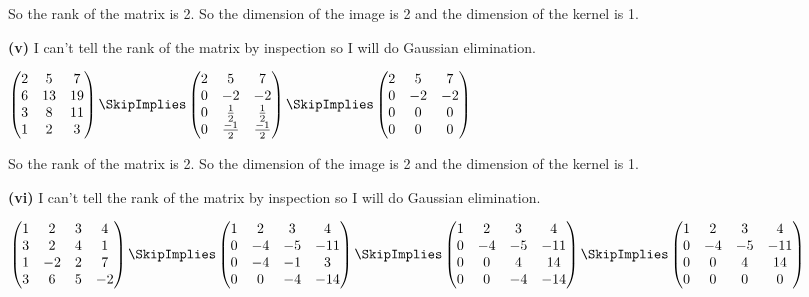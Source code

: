 \documentclass[oneside,12pt]{amsart}
\begin{document}
\bigskip

So the rank of the matrix is 2. So the dimension of the image is 2 and the
dimension of the kernel is 1.

\bigskip

\textbf{(v)} I can't tell the rank of the matrix by inspection so I will do
Gaussian elimination.

\bigskip

$
\begin{pmatrix}
2 & 5 & 7 \\
6 & 13 & 19 \\
3 & 8 & 11 \\
1 & 2 & 3
\end{pmatrix}
\SkipImplies
\begin{pmatrix}
2 & 5 & 7 \\
0 & -2 & -2 \\
0 & \frac{1}{2} & \frac{1}{2} \\
0 & \frac{-1}{2} & \frac{-1}{2}
\end{pmatrix}
\SkipImplies
\begin{pmatrix}
2 & 5 & 7 \\
0 & -2 & -2 \\
0 & 0 & 0 \\
0 & 0 & 0
\end{pmatrix}
$

\bigskip

So the rank of the matrix is 2. So the dimension of the image is 2 and the
dimension of the kernel is 1.

\bigskip

\textbf{(vi)} I can't tell the rank of the matrix by inspection so I will do
Gaussian elimination.

\bigskip

$
\begin{pmatrix}
1 & 2 & 3 & 4 \\
3 & 2 & 4 & 1 \\
1 & -2 & 2 & 7 \\
3 & 6 & 5 & -2
\end{pmatrix}
\SkipImplies
\begin{pmatrix}
1 & 2 & 3 & 4 \\
0 & -4 & -5 & -11 \\
0 & -4 & -1 & 3 \\
0 & 0 & -4 & -14
\end{pmatrix}
\SkipImplies
\begin{pmatrix}
1 & 2 & 3 & 4 \\
0 & -4 & -5 & -11 \\
0 & 0 & 4 & 14 \\
0 & 0 & -4 & -14
\end{pmatrix}
\SkipImplies
\begin{pmatrix}
1 & 2 & 3 & 4 \\
0 & -4 & -5 & -11 \\
0 & 0 & 4 & 14 \\
0 & 0 & 0 & 0
\end{pmatrix}
$
\end{document}
